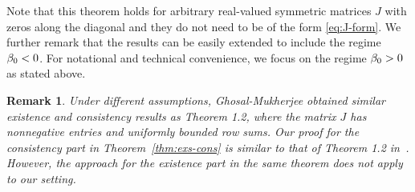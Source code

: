 \documentclass[letterpaper,11pt,reqno]{amsart}
\newtheorem{rem}[thm]{Remark}
\newtheorem{remark}[theorem]{Remark}
\begin{document}
Note that this theorem holds for arbitrary real-valued symmetric matrices $J$ with zeros along the diagonal and they do not need to be of the form \eqref{eq:J-form}. We further remark that the results can be easily extended to include the regime $\beta_0<0$. For notational and technical convenience, we focus on the regime $\beta_0>0$ as stated above. 

\begin{rem}\label{remark1.1}
\rm
   Under different assumptions, Ghosal-Mukherjee \cite{GM20} obtained similar existence and consistency results as Theorem 1.2, where the matrix $J$ has nonnegative entries and uniformly bounded row sums. 
    Our proof for the consistency part in Theorem~\ref{thm:exs-cons} is similar to that of Theorem 1.2 in~\cite{GM20}.   However, the approach for the existence part in the same theorem does not apply to our setting.
    
\end{rem}

\end{document}
